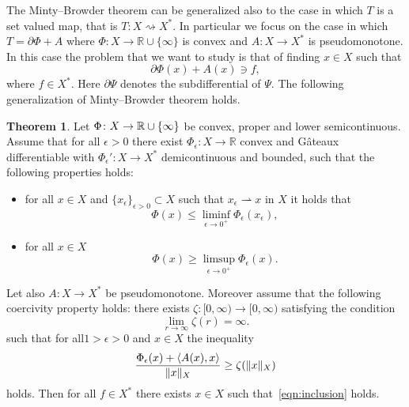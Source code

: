 \documentclass[a4paper,10pt,twoside]{amsbook}
\numberwithin{section}{chapter}
\numberwithin{equation}{chapter}
\theoremstyle{definition}
\newtheorem{thm}[prop]{Theorem}
\DeclarePairedDelimiter{\norm}{\lVert}{\rVert}
\DeclarePairedDelimiter{\dual}{\langle}{\rangle}
\begin{document}
The Minty--Browder theorem can be generalized also to the case in which $T$ is a set valued map, that is $T\colon X\rightsquigarrow X^*$. In particular we focus on the case in which $T=\partial\Phi+A$ where $\Phi\colon X\to\mathbb{R}\cup\{\infty\}$ is convex and $A\colon X\to X^*$ is pseudomonotone. In this case the problem that we want to study is that of finding $x\in X$ such that
\begin{equation}
\label{eqn:inclusion}
\partial\Phi(x)+A(x)\ni f,
\end{equation}
where $f\in X^*$. Here $\partial\Psi$ denotes the subdifferential of $\Psi$. The following generalization of Minty--Browder theorem holds.
\begin{thm}
\label{thm:inclusion}
Let $\Phi\colon X\to\mathbb{R}\cup\mathbb\{\infty\}$ be convex, proper and lower semicontinuous. Assume that for all $\epsilon>0$ there exist $\Phi_\epsilon\colon X\to\mathbb{R}$ convex and G\^ateaux differentiable with $\Phi_\epsilon'\colon X\to X^*$ demicontinuous and bounded, such that the following properties holds:
\begin{itemize}
\item[(i)] for all $x\in X$ and $\{x_\epsilon\}_{\epsilon>0}\subset X$ such that $x_\epsilon\rightharpoonup x$ in $X$ it holds that
\[
\Phi(x)\le\liminf_{\epsilon\to0^+}\Phi_\epsilon(x_\epsilon),
\]
\item[(ii)] for all $x\in X$
\[
\Phi(x)\ge\limsup_{\epsilon\to 0^+}\Phi_\epsilon(x).
\]
\end{itemize}
Let also $A\colon X\to X^*$ be pseudomonotone. Moreover assume that the following coercivity property holds: there exists $\zeta\colon[0,\infty)\to[0,\infty)$ satisfying the condition
\[
\lim_{r\to\infty}\zeta(r)=\infty.
\]
such that for all$1>\epsilon>0$ and $x\in X$ the inequality
\begin{equation}
\label{eqn:coercivity-property}
\dfrac{\Phi_\epsilon(x)+\dual{A(x),x}}{\norm{x}_X}\ge\zeta(\norm{x}_X)
\end{equation}
holds. Then for all $f\in X^*$ there exists $x\in X$ such that~\eqref{eqn:inclusion} holds.
\end{thm}
\end{document}

